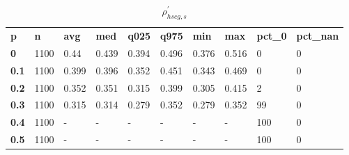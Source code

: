 \begin{table}[h]
 \centering 
\footnotesize
\caption{$\rho_{hscg,s}^\prime $}
\label{tab:alphahscgs}
\begin{tabular}[h]{| l l l l l l l l l l|
    } \hline
\textbf{ p} & \textbf{ n} & \textbf{ avg} & \textbf{ med} & \textbf{ q025} & \textbf{ q975} & \textbf{ min} & \textbf{ max} & \textbf{ pct\_0} & \textbf{ pct\_nan}
           \\
  \textbf{  0} & 1100 &  0.44 & 0.439 & 0.394 & 0.496 & 0.376 & 0.516 &   0 & 0
           \\
  \textbf{0.1} & 1100 & 0.399 & 0.396 & 0.352 & 0.451 & 0.343 & 0.469 &   0 & 0
           \\
  \textbf{0.2} & 1100 & 0.352 & 0.351 & 0.315 & 0.399 & 0.305 & 0.415 &   2 & 0
           \\
  \textbf{0.3} & 1100 & 0.315 & 0.314 & 0.279 & 0.352 & 0.279 & 0.352 &  99 & 0
           \\
  \textbf{0.4} & 1100 & - & - & - & - & - & - & 100 & 0
           \\
  \textbf{0.5} & 1100 & - & - & - & - & - & - & 100 & 0
           \\
 \hline \end{tabular}
 \end{table}
